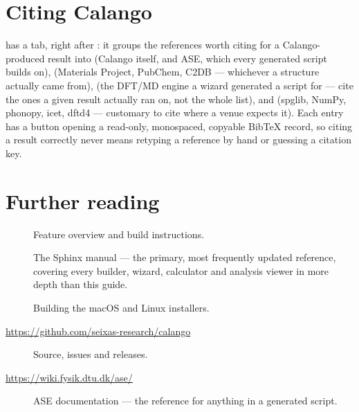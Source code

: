 \section{Citing Calango}
\label{sec:citing}

\menusep{} has a  tab, right
after : it groups the references worth citing for
a Calango-produced result into  (Calango itself, and ASE, which
every generated script builds on),  (Materials Project,
PubChem, C2DB --- whichever a structure actually came from), 
(the DFT/MD engine a wizard generated a script for --- cite the ones a
given result actually ran on, not the whole list), and 
(spglib, NumPy, phonopy, icet, dftd4 --- customary to cite where a venue
expects it). Each entry has a  button opening a
read-only, monospaced, copyable BibTeX record, so citing a result correctly
never means retyping a reference by hand or guessing a citation key.

\section{Further reading}

\begin{description}
  \item[] Feature overview and build instructions.
  \item[] The Sphinx manual --- the primary, most
    frequently updated reference, covering every builder, wizard,
    calculator and analysis viewer in more depth than this guide.
  \item[] Building the macOS and Linux installers.
  \item[\url{https://github.com/seixas-research/calango}] Source, issues
    and releases.
  \item[\url{https://wiki.fysik.dtu.dk/ase/}] ASE documentation --- the
    reference for anything in a generated script.
\end{description}
